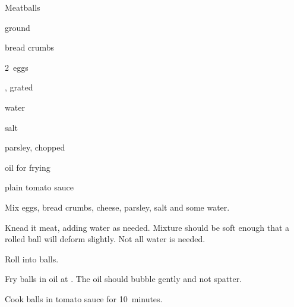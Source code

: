 \begin{recipe}{Meatballs}{}{}

\begin{ingredients}
\item {} ground 
\item {} bread crumbs
\item 2~eggs
\item {} , grated
\item {} water
\item {} salt
\item parsley, chopped
\item oil for frying
\item plain tomato sauce
\end{ingredients}

\begin{directions}
\item Mix eggs, bread crumbs, cheese, parsley, salt and some water.
\item Knead it meat, adding water as needed. Mixture should be soft enough that a rolled ball will deform slightly. Not all water is needed.
\item Roll into balls.
\item Fry balls in oil at . The oil should bubble gently and not spatter.
\item Cook balls in tomato sauce for 10~minutes.
\end{directions}

\end{recipe}
